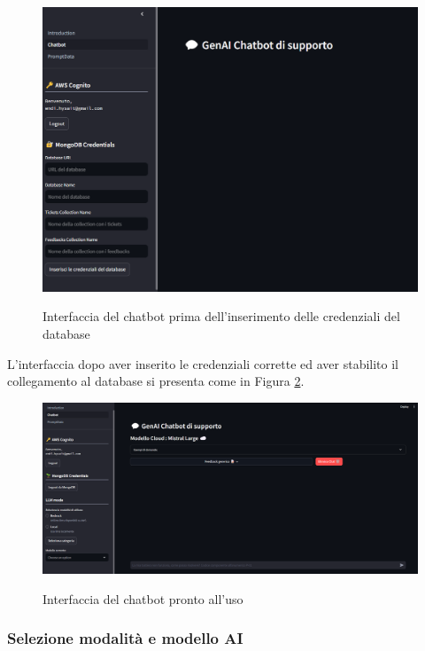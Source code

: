 \begin{figure}[H]
    \centering
    \includegraphics[alt={Interfaccia del chatbot prima dell'inserimento delle credenziali del database}, width=1\columnwidth]{img/chatbotDefault.png}
    \caption{Interfaccia del chatbot prima dell'inserimento delle credenziali del database}
    \label{fig:database_autentication}
\end{figure}

L'interfaccia dopo aver inserito le credenziali corrette ed aver stabilito il collegamento al database si presenta come in Figura \ref{fig:chatbot_ready}.

\begin{figure}[H]
    \centering
    \includegraphics[alt={Interfaccia del chatbot pronto all'uso}, width=1\columnwidth]{img/chatbotReady.png}
    \caption{Interfaccia del chatbot pronto all'uso}
    \label{fig:chatbot_ready}
\end{figure}

\subsubsection*{Selezione modalità e modello AI}

